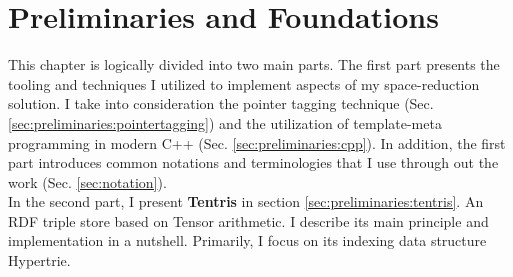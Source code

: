 \chapter{Preliminaries and Foundations}
\label{ch:preliminaries}

This chapter is logically divided into two main parts. The first part presents the tooling and techniques I utilized to implement aspects of my space-reduction solution. I take into consideration the pointer tagging technique (Sec. \ref{sec:preliminaries:pointertagging}) and the utilization of template-meta programming in modern C++ (Sec. \ref{sec:preliminaries:cpp}). In addition, the first part introduces common notations and terminologies that I  use through out the work (Sec. \ref{sec:notation}). \\ 

In the second part, I present \textbf{Tentris}  in section \ref{sec:preliminaries:tentris}. An RDF triple store based on Tensor arithmetic. I describe its main principle and implementation in a nutshell. Primarily, I focus on its indexing data structure Hypertrie. 




